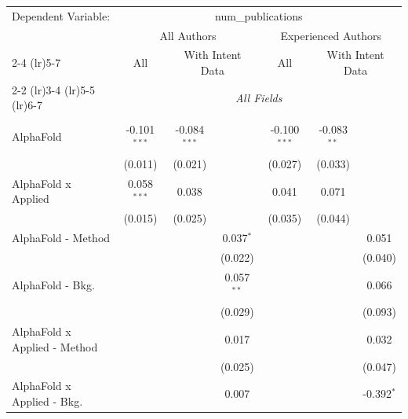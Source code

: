 \begingroup
\centering
\begin{tabular}{lcccccc}
   \tabularnewline \midrule \midrule
   Dependent Variable: & \multicolumn{6}{c}{num\_publications}\\
 & \multicolumn{3}{c}{All Authors} & \multicolumn{3}{c}{Experienced Authors} \\
\cmidrule(lr){2-4} \cmidrule(lr){5-7}
 & \multicolumn{1}{c}{All} & \multicolumn{2}{c}{With Intent Data} & \multicolumn{1}{c}{All} & \multicolumn{2}{c}{With Intent Data} \\
\cmidrule(lr){2-2} \cmidrule(lr){3-4} \cmidrule(lr){5-5} \cmidrule(lr){6-7}
 & \multicolumn{6}{c}{\textit{All Fields}} \\ \\
   AlphaFold                      & -0.101$^{***}$ & -0.084$^{***}$ &               & -0.100$^{***}$ & -0.083$^{**}$ &   \\   
                                  & (0.011)        & (0.021)        &               & (0.027)        & (0.033)       &   \\   
   AlphaFold x Applied            & 0.058$^{***}$  & 0.038          &               & 0.041          & 0.071         &   \\   
                                  & (0.015)        & (0.025)        &               & (0.035)        & (0.044)       &   \\   
   AlphaFold - Method             &                &                & 0.037$^{*}$   &                &               & 0.051\\   
                                  &                &                & (0.022)       &                &               & (0.040)\\   
   AlphaFold - Bkg.               &                &                & 0.057$^{**}$  &                &               & 0.066\\   
                                  &                &                & (0.029)       &                &               & (0.093)\\   
   AlphaFold x Applied - Method   &                &                & 0.017         &                &               & 0.032\\   
                                  &                &                & (0.025)       &                &               & (0.047)\\   
   AlphaFold x Applied - Bkg.     &                &                & 0.007         &                &               & -0.392$^{*}$\\   

\end{tabular}
